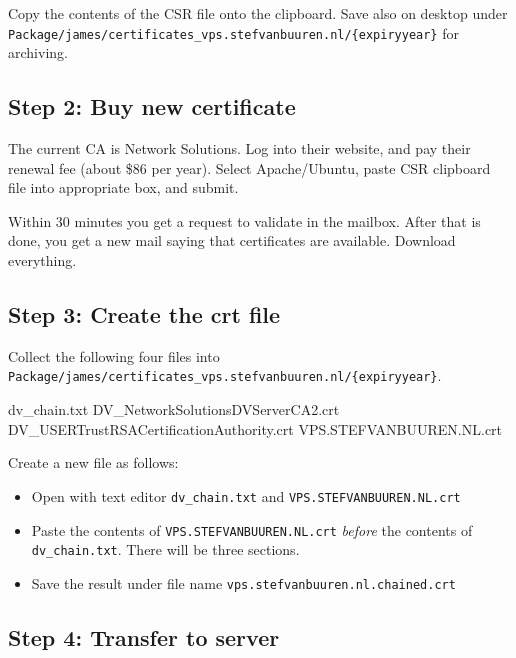 \documentclass[
]{book}
\newenvironment{Shaded}{\begin{snugshade}}{\end{snugshade}}
\newcommand{\ExtensionTok}[1]{#1}
\providecommand{\tightlist}{%
  \setlength{\itemsep}{0pt}\setlength{\parskip}{0pt}}
\begin{document}
Copy the contents of the CSR file onto the clipboard. Save also on desktop under \texttt{Package/james/certificates\_vps.stefvanbuuren.nl/\{expiryyear\}} for archiving.

\hypertarget{step-2-buy-new-certificate}{%
\subsection{Step 2: Buy new certificate}\label{step-2-buy-new-certificate}}

The current CA is Network Solutions. Log into their website, and pay their renewal fee (about \$86 per year). Select Apache/Ubuntu, paste CSR clipboard file into appropriate box, and submit.

Within 30 minutes you get a request to validate in the mailbox. After that is done, you get a new mail saying that certificates are available. Download everything.

\hypertarget{step-3-create-the-crt-file}{%
\subsection{Step 3: Create the crt file}\label{step-3-create-the-crt-file}}

Collect the following four files into \texttt{Package/james/certificates\_vps.stefvanbuuren.nl/\{expiryyear\}}.

\begin{Shaded}
\begin{Highlighting}[]
\ExtensionTok{dv\_chain.txt}
\ExtensionTok{DV\_NetworkSolutionsDVServerCA2.crt}
\ExtensionTok{DV\_USERTrustRSACertificationAuthority.crt}
\ExtensionTok{VPS.STEFVANBUUREN.NL.crt}
\end{Highlighting}
\end{Shaded}

Create a new file as follows:

\begin{itemize}
\tightlist
\item
  Open with text editor \texttt{dv\_chain.txt} and \texttt{VPS.STEFVANBUUREN.NL.crt}
\item
  Paste the contents of \texttt{VPS.STEFVANBUUREN.NL.crt} \emph{before} the contents of \texttt{dv\_chain.txt}. There will be three sections.
\item
  Save the result under file name \texttt{vps.stefvanbuuren.nl.chained.crt}
\end{itemize}

\hypertarget{step-4-transfer-to-server}{%
\subsection{Step 4: Transfer to server}\label{step-4-transfer-to-server}}
\end{document}
